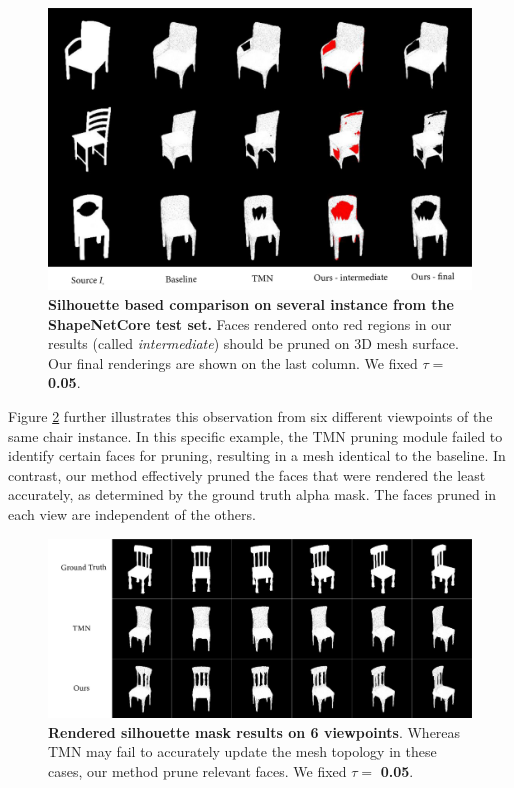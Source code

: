 \begin{figure}[htp!]%
\begin{center}
\includegraphics[width=\linewidth]{images/adaptativesr/highlight_faces_New.png}
\end{center}
    \caption{\textbf{Silhouette based comparison on several instance from the ShapeNetCore test set.} Faces rendered onto red regions in our results (called \textit{intermediate}) should be pruned on 3D mesh surface. Our final renderings are shown on the last column. We fixed $\tau = $ \textbf{0.05}.}
\label{fig:face2prune}
\end{figure}

Figure \ref{fig:pruning_multi_view} further illustrates this observation from six different viewpoints of the same chair instance. In this specific example, the TMN pruning module failed to identify certain faces for pruning, resulting in a mesh identical to the baseline. In contrast, our method effectively pruned the faces that were rendered the least accurately, as determined by the ground truth alpha mask. The faces pruned in each view are independent of the others. 

\begin{figure}[htp!]%
\begin{center}
\includegraphics[width=\linewidth]{images/adaptativesr/severalview2D_New.png}
\end{center}
    \caption{\textbf{Rendered silhouette mask results on 6 viewpoints}. Whereas TMN \citep{pan2019deep} may fail to accurately update the mesh topology in these cases, our method prune relevant faces. We fixed $\tau = $ \textbf{0.05}.}
\label{fig:pruning_multi_view}
\end{figure}

